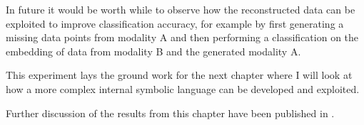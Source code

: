 In future it would be worth while to observe how the reconstructed data can be exploited to improve classification accuracy, for example by first generating a missing data points from modality A and then performing a classification on the embedding of data from modality B and the generated modality A.

This experiment lays the ground work for the next chapter where I will look at how a more complex internal symbolic language can be developed and exploited.

Further discussion of the results from this chapter have been published in \cite{sheppardtowards}. 
\theendnotes